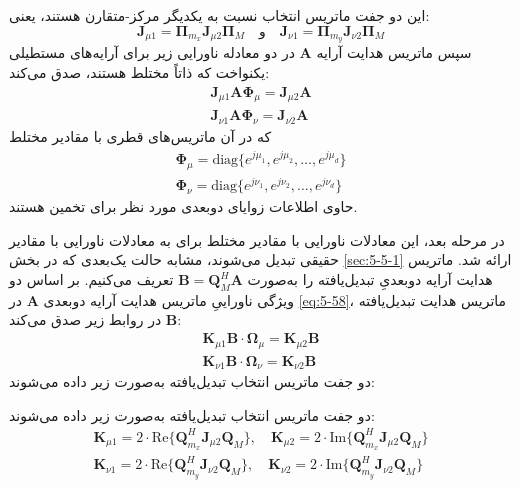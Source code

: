 این دو جفت ماتریس انتخاب نسبت به یکدیگر مرکز-متقارن هستند، یعنی:
\begin{equation}
	\bm{J}_{\mu 1} = \bm{\Pi}_{m_x} \bm{J}_{\mu 2} \bm{\Pi}_M \quad \text{و} \quad \bm{J}_{\nu 1} = \bm{\Pi}_{m_y} \bm{J}_{\nu 2} \bm{\Pi}_M
	\label{eq:5-57}
\end{equation}
سپس ماتریس هدایت آرایه $\bm{A}$ در دو معادله ناورایی زیر برای آرایه‌های مستطیلی یکنواخت که ذاتاً مختلط هستند، صدق می‌کند:
\begin{subequations}
	\begin{gather}
		\bm{J}_{\mu 1} \bm{A} \bm{\Phi}_{\mu} = \bm{J}_{\mu 2} \bm{A} \label{eq:5-58a} \\
		\bm{J}_{\nu 1} \bm{A} \bm{\Phi}_{\nu} = \bm{J}_{\nu 2} \bm{A} \label{eq:5-58b}
	\end{gather}
	\label{eq:5-58}
\end{subequations}
که در آن ماتریس‌های قطری با مقادیر مختلط
\begin{subequations}
	\begin{gather}
		\bm{\Phi}_{\mu} = \text{diag}\{e^{j\mu_1}, e^{j\mu_2}, \dots, e^{j\mu_d}\} \label{eq:5-59a} \\
		\bm{\Phi}_{\nu} = \text{diag}\{e^{j\nu_1}, e^{j\nu_2}, \dots, e^{j\nu_d}\} \label{eq:5-59b}
	\end{gather}
	\label{eq:5-59}
\end{subequations}
حاوی اطلاعات زوایای  دوبعدی مورد نظر برای تخمین هستند.

در مرحله بعد، این معادلات ناورایی با مقادیر مختلط برای  به معادلات ناورایی با مقادیر حقیقی تبدیل می‌شوند، مشابه حالت یک‌بعدی که در بخش \ref{sec:5-5-1} ارائه شد. ماتریس هدایت آرایه دوبعدیِ تبدیل‌یافته را به‌صورت $\bm{B} = \bm{Q}_M^H \bm{A}$ تعریف می‌کنیم. بر اساس دو ویژگی ناوراییِ ماتریس هدایت آرایه دوبعدی $\bm{A}$ در \eqref{eq:5-58}، ماتریس هدایت تبدیل‌یافته $\bm{B}$ در روابط زیر صدق می‌کند:
\begin{subequations}
	\begin{gather}
		\bm{K}_{\mu 1} \bm{B} \cdot \bm{\Omega}_{\mu} = \bm{K}_{\mu 2} \bm{B} \label{eq:5-60a} \\
		\bm{K}_{\nu 1} \bm{B} \cdot \bm{\Omega}_{\nu} = \bm{K}_{\nu 2} \bm{B} \label{eq:5-60b}
	\end{gather}
	\label{eq:5-60}
\end{subequations}
دو جفت ماتریس انتخاب تبدیل‌یافته به‌صورت زیر داده می‌شوند:

دو جفت ماتریس انتخاب تبدیل‌یافته به‌صورت زیر داده می‌شوند:
\begin{subequations}
	\begin{gather}
		\bm{K}_{\mu 1} = 2 \cdot \text{Re}\{\bm{Q}_{m_x}^H \bm{J}_{\mu 2} \bm{Q}_M\}, \quad \bm{K}_{\mu 2} = 2 \cdot \text{Im}\{\bm{Q}_{m_x}^H \bm{J}_{\mu 2} \bm{Q}_M\} \label{eq:5-61a} \\
		\bm{K}_{\nu 1} = 2 \cdot \text{Re}\{\bm{Q}_{m_y}^H \bm{J}_{\nu 2} \bm{Q}_M\}, \quad \bm{K}_{\nu 2} = 2 \cdot \text{Im}\{\bm{Q}_{m_y}^H \bm{J}_{\nu 2} \bm{Q}_M\} \label{eq:5-61b}
	\end{gather}
	\label{eq:5-61}
\end{subequations}

